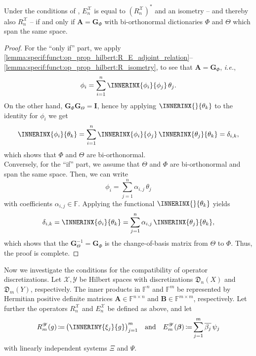 \documentclass[a4paper]{paper}
\newcommand*{\SPC}[1]{{\ensuremath{\mathscr{#1}}}}
\newcommand*{\SPCX}{\SPC{X}}
\newcommand*{\SPCY}{\SPC{Y}}
\newcommand{\FIELD}{{\ensuremath{\mathbb{F}}}}
\newcommand*{\Fn}{{\ensuremath{\FIELD^n}}}
\newcommand*{\Fm}{{\ensuremath{\FIELD^m}}}
\newcommand*{\Fnxn}{{\ensuremath{\FIELD^{n \times n}}}}
\newcommand*{\Fmxm}{{\ensuremath{\FIELD^{m \times m}}}}
\newcommand*{\EXT}[2]{\ensuremath{E_{#1}^{#2}}}
\newcommand*{\REST}[2]{\ensuremath{R_{#1}^{#2}}}
\newcommand*{\RnX}{{\ensuremath{\REST{n}{\SPC{X}}}}}
\newcommand*{\RmY}{{\ensuremath{\REST{m}{\SPC{Y}}}}}
\newcommand*{\EnX}{{\ensuremath{\EXT{n}{\SPC{X}}}}}
\newcommand*{\EmY}{{\ensuremath{\EXT{m}{\SPC{Y}}}}}
\newcommand*{\DISCR}[2]{{\ensuremath{\mathfrak{D}_{#2}(#1)}}}
\newcommand*{\DISCRnX}{\DISCR{X}{n}}
\newcommand*{\DISCRmY}{\DISCR{Y}{m}}
\DeclareMathOperator{\DEFEQ}{{\coloneqq}}
\newcommand{\ie}{\textsl{i.e.}\xspace}
\newcommand{\vbeta}{\boldsymbol{\beta}}
\newcommand{\vA}{\boldsymbol{A}}
\newcommand{\vB}{\boldsymbol{B}}
\newcommand{\vG}{\boldsymbol{G}}
\newcommand{\vI}{\boldsymbol{I}}
\begin{document}
\begin{corollary}
 \label{coroll:specif:funct:op_prop_hilbert_R_E_adjoint_relation}
 Under the conditions of , $\EnX$ is equal to $(\RnX)^*$ and 
 an isometry -- and thereby also $\RnX$ -- if and only if $\vA = \vG_\Phi$ with bi-orthonormal dictionaries $\Phi$ and 
 $\Theta$ which span the same space.
\end{corollary}
\vspace{1em}


\begin{proof}
 For the ``only if'' part, we apply 
 \eqref{lemma:specif:funct:op_prop_hilbert:R_E_adjoint_relation}--\eqref{lemma:specif:funct:op_prop_hilbert:R_isometry},
 to see that $\vA = \vG_\Phi$, \ie,
 \begin{equation*}
  \phi_i = \sum_{i=1}^n \INNERINX{\phi_i}{\phi_j}\, \theta_j.
 \end{equation*}
 On the other hand, $\vG_\Phi \vG_\Theta = \vI$, hence by applying $\INNERINX{}{\theta_k}$ to the identity 
 for $\phi_i$ we get
 \begin{equation*}
  \INNERINX{\phi_i}{\theta_k} 
  = \sum_{i=1}^n \INNERINX{\phi_i}{\phi_j}\, \INNERINX{\theta_j}{\theta_k} = \delta_{i,k},
 \end{equation*}
 which shows that $\Phi$ and $\Theta$ are bi-orthonormal.\\
 Conversely, for the ``if'' part, we assume that $\Theta$ and $\Phi$ are bi-orthonormal and span the same space. Then, 
 we can write
 \begin{equation*}
  \phi_i = \sum_{j=1}^n \alpha_{i,j}\, \theta_j
 \end{equation*}
 with coefficients $\alpha_{i,j} \in \FIELD$. Applying the functional $\INNERINX{}{\theta_k}$ yields
 \begin{equation*}
  \delta_{i,k} = \INNERINX{\phi_i}{\theta_k} = \sum_{j=1}^n \alpha_{i,j}\, \INNERINX{\theta_j}{\theta_k},
 \end{equation*}
 which shows that the $\vG_\Theta^{-1} = \vG_\Phi$ is the change-of-basis matrix from $\Theta$ to $\Phi$. Thus, the
 proof is complete.
\end{proof}


Now we investigate the conditions for the compatibility of operator discretizations. Let $\SPCX, \SPCY$ be Hilbert 
spaces with discretizations $\DISCRnX$ and $\DISCRmY$, respectively. The inner products in 
$\Fn$ and $\Fm$ be represented by Hermitian positive definite matrices $\vA \in \Fnxn$ and $\vB 
\in \Fmxm$, respectively. 
Let further the operators $\RnX$ and $\EnX$ be defined as above, and let
%
\begin{equation*}
 \RmY(g) \DEFEQ  \big( \INNERINY{\xi_j}{g} \big)_{j=1}^m
 \quad \text{and} \quad
 \EmY(\vbeta) \DEFEQ  \sum_{j=1}^m \overline{\beta_j}\, \psi_j
\end{equation*}
%
with linearly independent systems $\Xi$ and $\Psi$.
\end{document}
